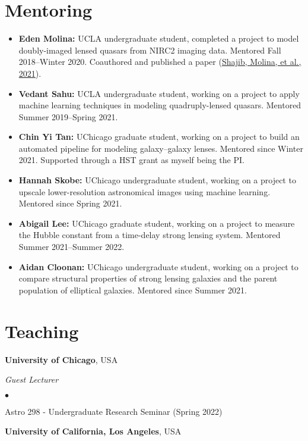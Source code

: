 \documentclass[margin, line]{res}
\newenvironment{list2}{
  \begin{list}{$\bullet$}{%
      \setlength{\itemsep}{0in}
      \setlength{\parsep}{0in} \setlength{\parskip}{0in}
      \setlength{\topsep}{0in} \setlength{\partopsep}{0in} 
      \setlength{\leftmargin}{0.2in}}}{\end{list}}
\begin{document}
\begin{resume}
\section{\sc Mentoring}
\begin{itemize}
	\item \textbf{Eden Molina:} UCLA undergraduate student, completed a project to model doubly-imaged lensed quasars from NIRC2 imaging data. Mentored Fall 2018--Winter 2020. Coauthored and published a paper (\href{https://doi:10.1093/mnras/stab532}{Shajib, Molina, et al., 2021}).
	\item \textbf{Vedant Sahu:} UCLA undergraduate student, working on a project to apply machine learning techniques in modeling quadruply-lensed quasars. Mentored Summer 2019--Spring 2021.
	\item \textbf{Chin Yi Tan:} UChicago graduate student, working on a project to build an automated pipeline for modeling galaxy--galaxy lenses. Mentored since Winter 2021. Supported through a \textsc{HST} grant as myself being the PI.
	\item \textbf{Hannah Skobe:} UChicago undergraduate student, working on a project to upscale lower-resolution astronomical images using machine learning. Mentored since Spring 2021.
	\item \textbf{Abigail Lee:} UChicago graduate student, working on a project to measure the Hubble constant from a time-delay strong lensing system. Mentored Summer 2021--Summer 2022.
	\item \textbf{Aidan Cloonan:} UChicago undergraduate student, working on a project to compare structural properties of strong lensing galaxies and the parent population of elliptical galaxies. Mentored since Summer 2021.
\end{itemize}


\section{\sc Teaching}
{\bf University of Chicago}, USA

{\em Guest Lecturer} \hfill {\bf}\\
\begin{list2}

	\item Astro 298 - Undergraduate Research Seminar (Spring 2022)
\end{list2}
	
{\bf University of California, Los Angeles}, USA




\end{resume}
\end{document}

